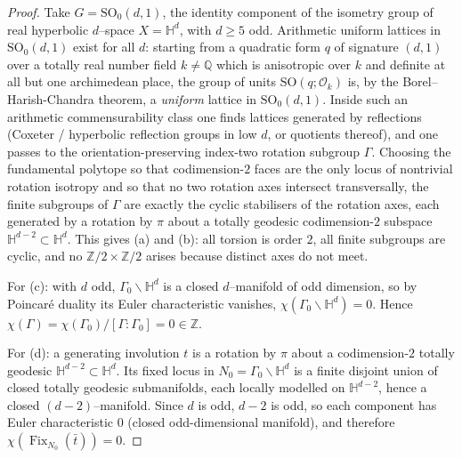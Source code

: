 \documentclass[12pt]{article}
\newcommand{\bQ}{\mathbb{Q}}
\newcommand{\bZ}{\mathbb{Z}}
\newcommand{\Fix}{\operatorname{Fix}}
\theoremstyle{definition}
\begin{document}
\begin{proof}
Take $G=\mathrm{SO}_0(d,1)$, the identity component of the isometry group of real
hyperbolic $d$--space $X=\mathbb H^d$, with $d\ge5$ odd.  Arithmetic uniform
lattices in $\mathrm{SO}_0(d,1)$ exist for all $d$: starting from a quadratic form
$q$ of signature $(d,1)$ over a totally real number field $k\neq\bQ$ which is
anisotropic over $k$ and definite at all but one archimedean place, the group of
units $\mathrm{SO}(q;\mathcal O_k)$ is, by the Borel--Harish-Chandra theorem, a
\emph{uniform} lattice in $\mathrm{SO}_0(d,1)$.  Inside such an arithmetic
commensurability class one finds lattices generated by reflections (Coxeter /
hyperbolic reflection groups in low $d$, or quotients thereof), and one passes to
the orientation-preserving index-two rotation subgroup $\Gamma$.  Choosing the
fundamental polytope so that codimension-$2$ faces are the only locus of nontrivial
rotation isotropy and so that no two rotation axes intersect transversally, the
finite subgroups of $\Gamma$ are exactly the cyclic stabilisers of the
rotation axes, each generated by a rotation by $\pi$ about a totally geodesic
codimension-$2$ subspace $\mathbb H^{d-2}\subset\mathbb H^d$.  This gives
(a) and (b): all torsion is order $2$, all finite subgroups are cyclic, and no
$\bZ/2\times\bZ/2$ arises because distinct axes do not meet.

For (c): with $d$ odd, $\Gamma_0\backslash\mathbb H^d$ is a closed
$d$--manifold of odd dimension, so by Poincar\'e duality its Euler characteristic
vanishes, $\chi(\Gamma_0\backslash\mathbb H^d)=0$.  Hence
$\chi(\Gamma)=\chi(\Gamma_0)/[\Gamma:\Gamma_0]=0\in\bZ$.

For (d): a generating involution $t$ is a rotation by $\pi$ about a
codimension-$2$ totally geodesic $\mathbb H^{d-2}\subset\mathbb H^d$.  Its fixed
locus in $N_0=\Gamma_0\backslash\mathbb H^d$ is a finite disjoint union of closed
totally geodesic submanifolds, each locally modelled on $\mathbb H^{d-2}$, hence a
closed $(d-2)$--manifold.  Since $d$ is odd, $d-2$ is odd, so each component has
Euler characteristic $0$ (closed odd-dimensional manifold), and therefore
$\chi(\Fix_{N_0}(\bar t))=0$.
\end{proof}
\end{document}
